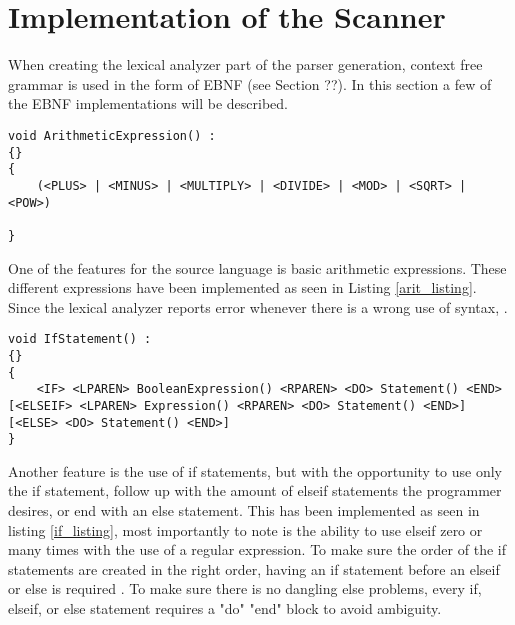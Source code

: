 \section{Implementation of the Scanner}
When creating the lexical analyzer part of the parser generation, context free grammar is used in the form of EBNF (see Section ??). In this section a few of the EBNF implementations will be described.
\begin{lstlisting}[label=arit_listing]
void ArithmeticExpression() :
{}
{
	(<PLUS> | <MINUS> | <MULTIPLY> | <DIVIDE> | <MOD> | <SQRT> | <POW>)

}

\end{lstlisting}
One of the features for the source language is basic arithmetic expressions. These different expressions have been implemented as seen in Listing \ref{arit_listing}. Since the lexical analyzer reports error whenever there is a wrong use of syntax, .


\begin{lstlisting}[label=if_listing]
void IfStatement() :
{}
{
    <IF> <LPAREN> BooleanExpression() <RPAREN> <DO> Statement() <END> [<ELSEIF> <LPAREN> Expression() <RPAREN> <DO> Statement() <END>] [<ELSE> <DO> Statement() <END>]
}
\end{lstlisting}
Another feature is the use of if statements, but with the opportunity to use only the if statement, follow up with the amount of elseif statements the programmer desires, or end with an else statement. This has been implemented as seen in listing \ref{if_listing}, most importantly to note is the ability to use elseif zero or many times with the use of a regular expression. To make sure the order of the if statements are created in the right order, having an if statement before an elseif or else is required . To make sure there is no dangling else problems, every if, elseif, or else statement requires a "do" "end" block to avoid ambiguity.